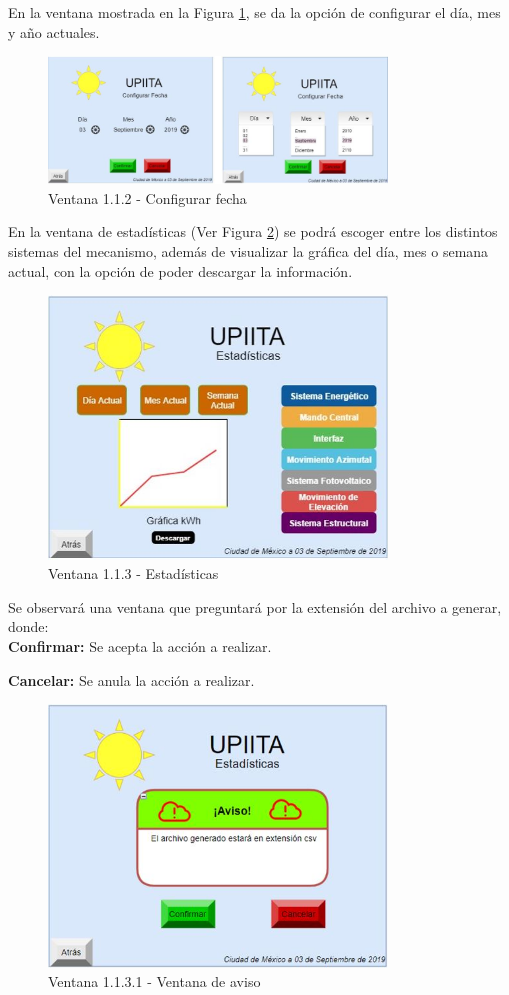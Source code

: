 En la ventana mostrada en la Figura \ref{fig:v112}, se da la opción de configurar el día, mes y año actuales.
\begin{figure}[H]
	\centering
	\includegraphics[width=9cm]{imagenes/v112}
	\caption{Ventana 1.1.2 - Configurar fecha}
	\label{fig:v112}
\end{figure}

En la ventana de estadísticas (Ver Figura \ref{fig:v113}) se podrá escoger entre los distintos sistemas del mecanismo, además de visualizar la gráfica del día, mes o semana actual, con la opción de poder descargar la información.
\begin{figure}[H]
	\centering
	\includegraphics[width=9cm]{imagenes/v113}
	\caption{Ventana 1.1.3 - Estadísticas}
	\label{fig:v113}
\end{figure}

Se observará una ventana que preguntará por la extensión del archivo a generar, donde: \\

\textbf{Confirmar:} Se acepta la acción a realizar.

\textbf{Cancelar:} Se anula la acción a realizar.
\begin{figure}[H]
	\centering
	\includegraphics[width=9cm]{imagenes/v1131}
	\caption{Ventana 1.1.3.1 - Ventana de aviso}
	\label{fig:v1131}
\end{figure}


